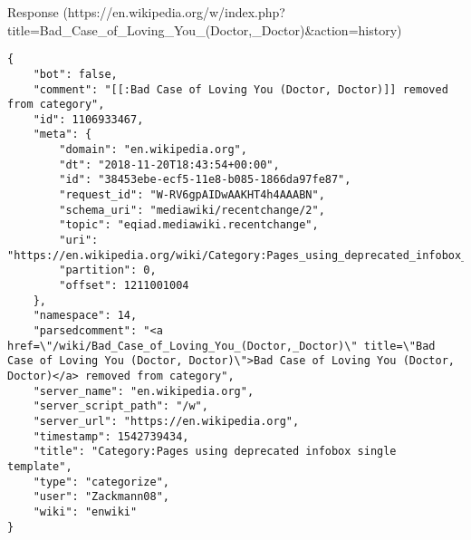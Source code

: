 Response (https://en.wikipedia.org/w/index.php?title=Bad_Case_of_Loving_You_(Doctor,_Doctor)&action=history)
\begin{lstlisting}
{
	"bot": false,
	"comment": "[[:Bad Case of Loving You (Doctor, Doctor)]] removed from category",
	"id": 1106933467,
	"meta": {
		"domain": "en.wikipedia.org",
		"dt": "2018-11-20T18:43:54+00:00",
		"id": "38453ebe-ecf5-11e8-b085-1866da97fe87",
		"request_id": "W-RV6gpAIDwAAKHT4h4AAABN",
		"schema_uri": "mediawiki/recentchange/2",
		"topic": "eqiad.mediawiki.recentchange",
		"uri": "https://en.wikipedia.org/wiki/Category:Pages_using_deprecated_infobox_single_template",
		"partition": 0,
		"offset": 1211001004
	},
	"namespace": 14,
	"parsedcomment": "<a href=\"/wiki/Bad_Case_of_Loving_You_(Doctor,_Doctor)\" title=\"Bad Case of Loving You (Doctor, Doctor)\">Bad Case of Loving You (Doctor, Doctor)</a> removed from category",
	"server_name": "en.wikipedia.org",
	"server_script_path": "/w",
	"server_url": "https://en.wikipedia.org",
	"timestamp": 1542739434,
	"title": "Category:Pages using deprecated infobox single template",
	"type": "categorize",
	"user": "Zackmann08",
	"wiki": "enwiki"
}
\end{lstlisting}
